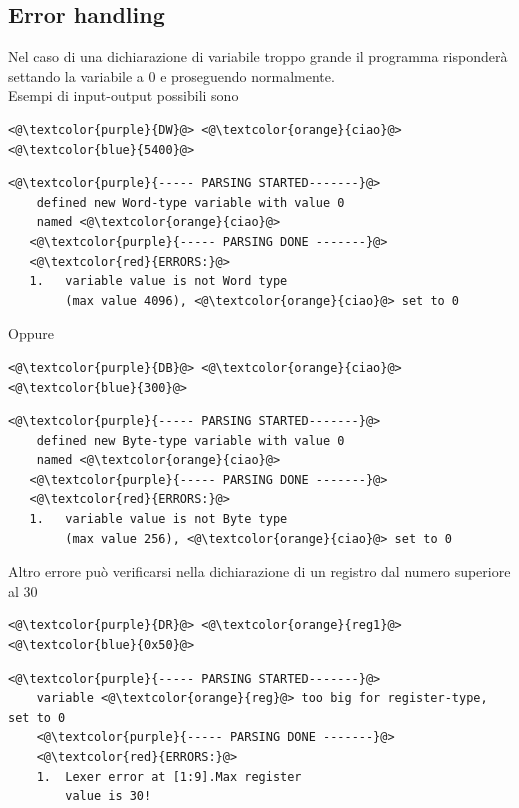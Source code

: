\subsection{Error handling}
Nel caso di una dichiarazione di variabile troppo grande il programma risponderà settando la variabile a 0 e proseguendo normalmente.
\\Esempi di input-output possibili sono
\begin{lstlisting}[caption=input]
    <@\textcolor{purple}{DW}@> <@\textcolor{orange}{ciao}@> <@\textcolor{blue}{5400}@>
\end{lstlisting}
\begin{lstlisting}[caption=output]
   <@\textcolor{purple}{----- PARSING STARTED-------}@>
    defined new Word-type variable with value 0 
    named <@\textcolor{orange}{ciao}@>
   <@\textcolor{purple}{----- PARSING DONE -------}@>
   <@\textcolor{red}{ERRORS:}@>
   1.	variable value is not Word type
        (max value 4096), <@\textcolor{orange}{ciao}@> set to 0
\end{lstlisting}
Oppure 
\begin{lstlisting}[caption=input]
    <@\textcolor{purple}{DB}@> <@\textcolor{orange}{ciao}@> <@\textcolor{blue}{300}@>
\end{lstlisting}
\begin{lstlisting}[caption=output]
   <@\textcolor{purple}{----- PARSING STARTED-------}@>
    defined new Byte-type variable with value 0 
    named <@\textcolor{orange}{ciao}@>
   <@\textcolor{purple}{----- PARSING DONE -------}@>
   <@\textcolor{red}{ERRORS:}@>
   1.	variable value is not Byte type
        (max value 256), <@\textcolor{orange}{ciao}@> set to 0
\end{lstlisting}
\newpage
Altro errore può verificarsi nella dichiarazione di un registro dal numero superiore al 30

\begin{lstlisting}[caption=input]
    <@\textcolor{purple}{DR}@> <@\textcolor{orange}{reg1}@> <@\textcolor{blue}{0x50}@>
\end{lstlisting}

\begin{lstlisting}[caption=output]
    <@\textcolor{purple}{----- PARSING STARTED-------}@>
    variable <@\textcolor{orange}{reg}@> too big for register-type, set to 0
    <@\textcolor{purple}{----- PARSING DONE -------}@>
    <@\textcolor{red}{ERRORS:}@>
    1.	Lexer error at [1:9].Max register 
        value is 30!
\end{lstlisting}

